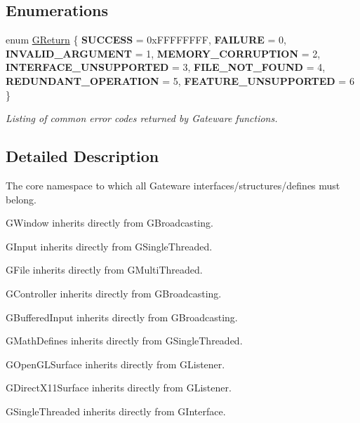 \subsection*{Enumerations}
\begin{DoxyCompactItemize}
\item 
\mbox{\label{namespace_g_w_a67a839e3df7ea8a5c5686613a7a3de21}} 
enum \mbox{\hyperlink{namespace_g_w_a67a839e3df7ea8a5c5686613a7a3de21}{G\+Return}} \{ \newline
{\bfseries S\+U\+C\+C\+E\+SS} = 0x\+F\+F\+F\+F\+F\+F\+FF, 
{\bfseries F\+A\+I\+L\+U\+RE} = 0, 
{\bfseries I\+N\+V\+A\+L\+I\+D\+\_\+\+A\+R\+G\+U\+M\+E\+NT} = 1, 
{\bfseries M\+E\+M\+O\+R\+Y\+\_\+\+C\+O\+R\+R\+U\+P\+T\+I\+ON} = 2, 
\newline
{\bfseries I\+N\+T\+E\+R\+F\+A\+C\+E\+\_\+\+U\+N\+S\+U\+P\+P\+O\+R\+T\+ED} = 3, 
{\bfseries F\+I\+L\+E\+\_\+\+N\+O\+T\+\_\+\+F\+O\+U\+ND} = 4, 
{\bfseries R\+E\+D\+U\+N\+D\+A\+N\+T\+\_\+\+O\+P\+E\+R\+A\+T\+I\+ON} = 5, 
{\bfseries F\+E\+A\+T\+U\+R\+E\+\_\+\+U\+N\+S\+U\+P\+P\+O\+R\+T\+ED} = 6
 \}
\begin{DoxyCompactList}\small\item\em Listing of common error codes returned by Gateware functions. \end{DoxyCompactList}\end{DoxyCompactItemize}


\subsection{Detailed Description}
The core namespace to which all Gateware interfaces/structures/defines must belong. 

G\+Window inherits directly from G\+Broadcasting.

G\+Input inherits directly from G\+Single\+Threaded.

G\+File inherits directly from G\+Multi\+Threaded.

G\+Controller inherits directly from G\+Broadcasting.

G\+Buffered\+Input inherits directly from G\+Broadcasting.

G\+Math\+Defines inherits directly from G\+Single\+Threaded.

G\+Open\+G\+L\+Surface inherits directly from G\+Listener.

G\+Direct\+X11\+Surface inherits directly from G\+Listener.

G\+Single\+Threaded inherits directly from G\+Interface.

